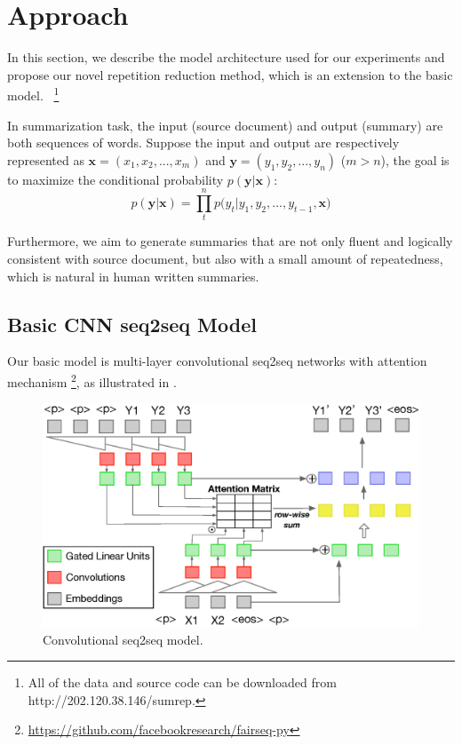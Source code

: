 \section{Approach}
\label{sec:approach}

In this section, we describe the model architecture used for our experiments
and propose our novel repetition reduction method, which is an extension to the basic model.
~\footnote{
All of the data and source code
can be downloaded from http://202.120.38.146/sumrep.}

In summarization task, the input (source document) and
output (summary) are both sequences of words.
Suppose the input and output are respectively represented as
$\textbf{x} = (x_{1},x_{2},...,x_{m})$ and 
$\textbf{y} = (y_{1}, y_{2},..., y_{n})$ ($m>n$),
the goal is to maximize the conditional probability
$p(\textbf{y}|\textbf{x})$:
\begin{equation}
p(\textbf{y} | \textbf{x}) \!=\! {\prod^n_{t} {p(y_{t} | y_{1}, y_{2},..., y_{t-1}, \textbf{x}})}
\end{equation}

Furthermore, we aim to generate summaries that are not only fluent 
and logically consistent with source document, but also with 
a small amount of repeatedness, which is natural in human written summaries.  

\subsection{Basic CNN seq2seq Model}
\label{sec:basic}
Our basic model is multi-layer convolutional seq2seq networks \citep{gehring2017convs2s} with attention mechanism
\footnote{\url{https://github.com/facebookresearch/fairseq-py}}, 
as illustrated in . 

\begin{figure}[th]
    \centering
    \includegraphics[width=0.8\linewidth]{cnn}
    \caption{Convolutional seq2seq model.}
    \label{fig:basicModel}
\end{figure}

